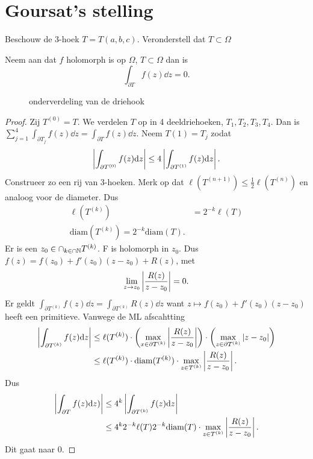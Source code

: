\section{Goursat's stelling} \label{sec:goursat's_stelling}
Beschouw de 3-hoek $T = T(a, b, c)$. 
Veronderstell dat $T \subset  \Omega$
 \begin{stelling}
	 [Goursat]
	 Neem aan dat  $f$ holomorph is op $\Omega$, $T \subset  \Omega$ dan is \[
		 \int_{\partial T} f(z) \dd z = 0
	 .\] 
\end{stelling}
\begin{figure}[ht]
    \centering
    \caption{onderverdeling van de driehook}
    \label{fig:onderverdeling-van-de-driehook}
\end{figure}
\begin{proof}
	Zij $T^(0) = T$. We verdelen $T$ op in 4 deeldriehoeken, $T_1, T_2, T_3, T_4$.	
	Dan is $\sum_{j = 1}^{4} \int_{\partial T_j}f(z) \dd z = \int_{\partial T} f(z) \dd z$. 
	Neem $T(1) = T_j$ zodat  \[
		\left| \int_{\partial T^{(0)}} f(z) \mathrm{d} z  \right| \le 4 \left| \int_{\partial T^{(1)}} f(z) \mathrm{d} z \right|
	.\] 
	Construeer zo een rij van 3-hoeken. Merk op dat $\ell(T^{(n+1)}) \le \frac{1}{2} \ell(T^{(n)})$
	en analoog voor de diameter. Dus 
	\begin{align*}
		\ell(T^{(k)}) &= 2^{-k}\ell(T) \\
		\text{diam}(T^{(k)}) = 2^{-k}\text{diam}(T)
	.\end{align*}
	Er is een $z_0 \in  \cap _{k \in \cap \mathbb{N}} T ^{(k)} $. 
	F is holomorph in $z_0$. Dus $f(z) = f(z_0) + f'(z_0)(z-z_0) + R(z)$, met \[
		\lim_{z \to z_0} \abs{\frac{R(z)}{z - z_0}} = 0
	.\] 
	Er geldt $\int_{\partial T^{(k)}}f(z) \dd z = \int_{\partial T^{(k)}} R(z) \dd z $ want $z\mapsto  f(z_0) + f'(z_0)(z - z_0)$ heeft een primitieve.
	Vanwege de ML afscahtting \begin{align*}
		\left| \int_{\partial T^{(k)}}f(z) \mathrm{d} z  \right| &\le \ell(T^{(k)})\cdot \left( \max_{x \in \partial T^{(k)}} \left| \frac{R(z)}{z - z_0} \right|\right)\cdot \left( \max_{z \in \partial T^{(k)}} \left| z - z_0 \right|\right)  \\
							 &\le \ell(T^{(k)}) \cdot \text{diam}(T^{(k)}) \cdot  \max_{z \in T^{(k)}}\left| \frac{R(z)}{z - z_0} \right|
	.\end{align*} 
	Dus \begin{align*}
		\left| \int_{\partial T} f(z) \mathrm{d} z) \right| &\le 4^{k}\left| \int_{\partial T^{(k)}}f(z) \mathrm{d} z \right|\\
						    &\le 4^{k}2^{-k}\ell(T) 2^{-k} \text{diam}(T) \cdot \max_{z \in T^{(k)}}\left| \frac{R(z)}{z - z_0} \right| 
	.\end{align*}
	Dit gaat naar 0.
\end{proof}

